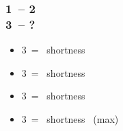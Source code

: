 \documentclass[12pt, a4paper]{article}
\begin{document}
\subsubsection*{1\spades\ -- 2\nt \\ 3\clubs\ -- ?}
\begin{itemize}
    \item 3\diams\ = \clubs\ shortness
    \item 3\hearts\ = \diams\ shortness
    \item 3\spades\ = \hearts\ shortness
    \item 3\nt\ = \hearts\ shortness \gf\ (max)
\end{itemize}

\end{document}

